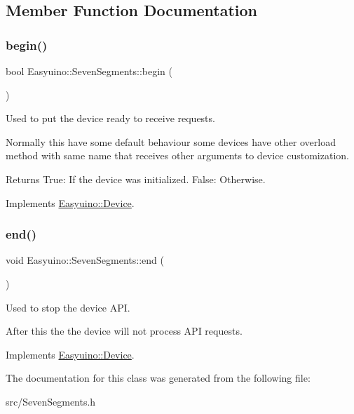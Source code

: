 \subsection{Member Function Documentation}
\mbox{\label{class_easyuino_1_1_seven_segments_ab59d5cbdc22567fb97854f32d899e02d}} 
\subsubsection{\texorpdfstring{begin()}{begin()}}
{\footnotesize\ttfamily bool Easyuino\+::\+Seven\+Segments\+::begin (\begin{DoxyParamCaption}{ }\end{DoxyParamCaption})\hspace{0.3cm}{\ttfamily [virtual]}}



Used to put the device ready to receive requests. 

Normally this have some default behaviour some devices have other overload method with same name that receives other arguments to device customization. \begin{DoxyReturn}{Returns}
True\+: If the device was initialized. False\+: Otherwise. 
\end{DoxyReturn}


Implements \hyperlink{class_easyuino_1_1_device_a2e7bb2fec849719a9d9432b57cdb72ba}{Easyuino\+::\+Device}.

\mbox{\label{class_easyuino_1_1_seven_segments_afea49385382a7b9c597b4fe42a003fee}} 
\subsubsection{\texorpdfstring{end()}{end()}}
{\footnotesize\ttfamily void Easyuino\+::\+Seven\+Segments\+::end (\begin{DoxyParamCaption}{ }\end{DoxyParamCaption})\hspace{0.3cm}{\ttfamily [virtual]}}



Used to stop the device A\+PI. 

After this the the device will not process A\+PI requests. 

Implements \hyperlink{class_easyuino_1_1_device_ab31018ef64adc84aa2ea575b2297548f}{Easyuino\+::\+Device}.



The documentation for this class was generated from the following file\+:\begin{DoxyCompactItemize}
\item 
src/Seven\+Segments.\+h\end{DoxyCompactItemize}
